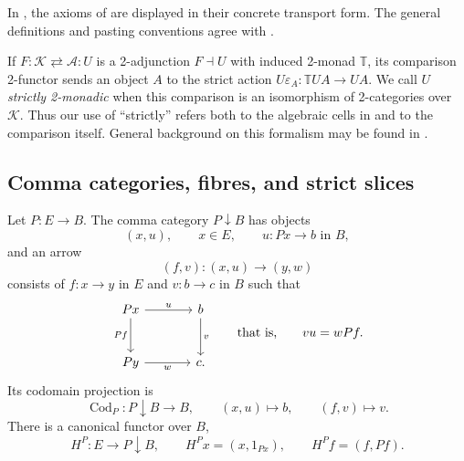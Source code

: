 \documentclass[11pt]{article}
\theoremstyle{plain}
\theoremstyle{definition}
\theoremstyle{remark}
\newcommand{\Cod}{\operatorname{Cod}}
\numberwithin{equation}{section}
\begin{document}
In , the axioms of
 are displayed in their concrete transport
form.  The general definitions and pasting conventions agree with
\citet{BlackwellKellyPower1989}.

If $F\colon\mathcal K\rightleftarrows\mathcal A\colon U$ is a
2-adjunction $F\dashv U$ with
induced 2-monad $\mathbb T$, its comparison 2-functor sends an object
$A$ to the strict action $U\varepsilon_A\colon\mathbb T UA\to UA$.
We call $U$ \emph{strictly 2-monadic} when this comparison is an
isomorphism of 2-categories over $\mathcal K$.  Thus our use of
``strictly'' refers both to the algebraic cells in
 and to the comparison itself.  General background
on this formalism may be found in
\citet{Street1972,BlackwellKellyPower1989}.

\subsection{Comma categories, fibres, and strict slices}

Let $P\colon E\to B$.  The comma category
$P\!\downarrow\!B$ has objects
\begin{equation*}
  (x,u),
  \qquad x\in E,\qquad u\colon Px\longrightarrow b\text{ in }B,
\end{equation*}
and an arrow
\begin{equation*}
  (f,v)\colon(x,u)\longrightarrow(y,w)
\end{equation*}
consists of $f\colon x\to y$ in $E$ and $v\colon b\to c$ in $B$
such that
\begin{equation}
\begin{tikzcd}[column sep=large,row sep=large]
Px \arrow[r,"u"] \arrow[d,"Pf"']
  & b \arrow[d,"v"] \\
Py \arrow[r,"w"'] & c .
\end{tikzcd}
\qquad\text{that is,}\qquad
vu=wPf.
  \label{eq:comma-arrow}
\end{equation}
Its codomain projection is
\begin{equation*}
  \Cod_{P}\colon P\!\downarrow\!B\longrightarrow B,
  \qquad (x,u)\longmapsto b,\qquad(f,v)\longmapsto v.
\end{equation*}
There is a canonical functor over $B$,
\begin{equation}
  H^{P}\colon E\longrightarrow P\!\downarrow\!B,
  \qquad
  H^{P}x=(x,1_{Px}),\qquad H^{P}f=(f,Pf).
  \label{eq:HP-preliminary}
\end{equation}
\end{document}
